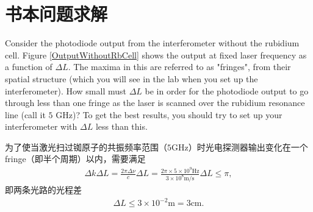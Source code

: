 \documentclass{assignment}
\begin{document}
\section{书本问题求解}
\begin{prob}
    Consider the photodiode output from the interferometer without the rubidium cell. Figure \ref{OutputWithoutRbCell} shows the output at fixed laser frequency as a function of $\Delta L$. The maxima in this are referred to as "fringes", from their spatial structure (which you will see in the lab when you set up the interferometer). How small must $\Delta L$ be in order for the photodiode output to go through less than one fringe as the laser is scanned over the rubidium resonance line (call it $5$ GHz)? To get the best results, you should try to set up your interferometer with $\Delta L$ less than this.
\end{prob}
\begin{sol}
    为了使当激光扫过铷原子的共振频率范围（$5$GHz）时光电探测器输出变化在一个fringe（即半个周期）以内，需要满足
    \begin{align}
        \Delta k\Delta L=\frac{2\pi\Delta\nu}{c}\Delta L=\frac{2\pi\times 5\times 10^9\text{Hz}}{3\times 10^8\text{m/s}}\Delta L\leq\pi,
    \end{align}
    即两条光路的光程差
    \begin{align}
        \Delta L\leq 3\times 10^{-2}\text{m}=3\text{cm}.
    \end{align}
\end{sol}
\end{document}
